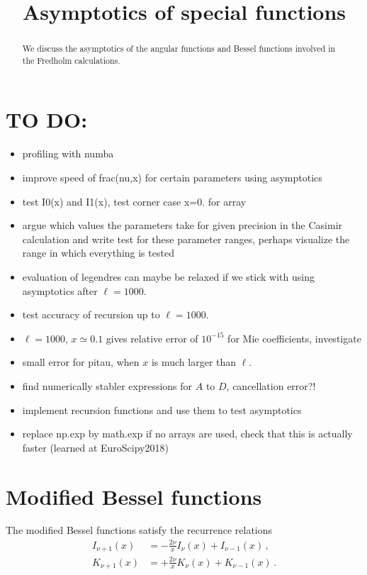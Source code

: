 \documentclass[onecolumn%
              ,superscriptaddress%
              ,aps%
              ,pra]{revtex4}
\begin{document}
\title{Asymptotics of special functions}


\begin{abstract}
We discuss the asymptotics of the angular functions and Bessel functions involved in the Fredholm calculations.
\end{abstract}

\maketitle
\section{TO DO:}
\begin{itemize}
\item profiling with numba
\item improve speed of frac(nu,x) for certain parameters using asymptotics
\item test I0(x) and I1(x), test corner case x=0. for array
\item argue which values the parameters take for given precision in the Casimir calculation and write test for these parameter ranges, perhaps visualize the range in which everything is tested
\item evaluation of legendres can maybe be relaxed if we stick with using asymptotics after $\ell=1000$.
\item test accuracy of recursion up to $\ell=1000$.
\item $\ell=1000$, $x\simeq 0.1$ gives relative error of $10^{-15}$ for Mie coefficients, investigate
\item small error for pitau, when $x$ is much larger than $\ell$.
\item find numerically stabler expressions for $A$ to $D$, cancellation error?!
\item implement recursion functions and use them to test asymptotics
\item replace np.exp by math.exp if no arrays are used, check that this is actually faster (learned at EuroScipy2018)
\end{itemize}
\section{Modified Bessel functions}

The modified Bessel functions satisfy the recurrence relations
\begin{align}
I_{\nu+1}(x) &= - \frac{2\nu}{x} I_\nu(x) + I_{\nu-1}(x)\,,\label{eq:rec_besseli} \\
K_{\nu+1}(x) &= + \frac{2\nu}{x} K_\nu(x) + K_{\nu-1}(x)\,.
\end{align}
\end{document}

